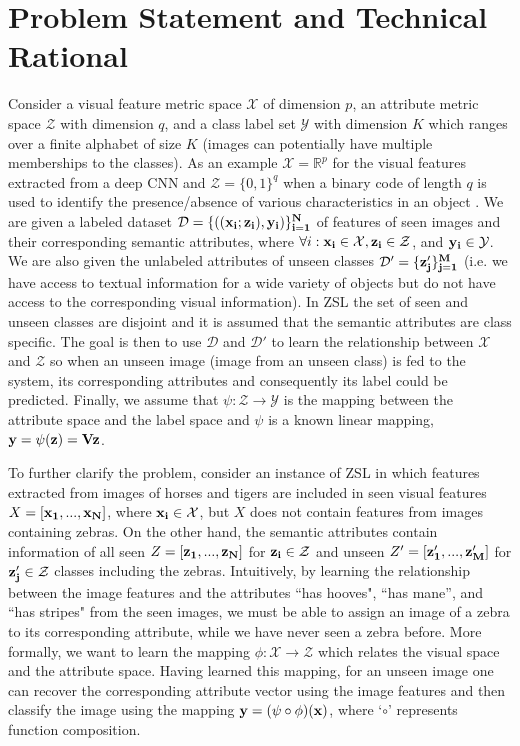 \documentclass[letterpaper]{article} %
\begin{document}
\section{Problem Statement and Technical Rational}

Consider a visual feature metric space $\mathcal{X}$ of dimension  $p$, an  attribute metric space $\mathcal{Z}$ with dimension $q$, and a class label set $\mathcal{Y}$ with dimension $K$ which ranges over a finite alphabet of size $K$ (images can potentially have multiple memberships to the classes). As an example $\mathcal{X}=\mathbb{R}^p$ for the visual features extracted from a deep CNN and $\mathcal{Z}=\{0,1\}^q$ when a binary code of length $q$ is used to identify the presence/absence of various characteristics in an object \cite{lampert2014attribute}. We are given a labeled dataset $\mathcal{D}=\{((\bf{x}_i;\bf{z}_i),\bf{y}_i)\}_{i=1}^N$ of features of seen images and their corresponding semantic attributes, where $\forall i:\bf{x}_i\in \mathcal{X}, \bf{z}_i\in \mathcal{Z}$, and $\bf{y}_{i}\in \mathcal{Y}$.  We are also given the unlabeled attributes of unseen classes  $\mathcal{D}'=\{\bf{z}'_j\}_{j=1}^M$ (i.e. we have access to textual information for a wide variety of objects but do not have access to the corresponding visual information).  In ZSL the set of seen and unseen classes are disjoint and it is  assumed that the semantic attributes are class specific. The goal is then to use $\mathcal{D}$ and $\mathcal{D}'$ to learn the relationship between $\mathcal{X}$ and $\mathcal{Z}$ so when an unseen image (image from an unseen class) is fed to the system, its corresponding attributes and consequently its label could be predicted. Finally, we assume that $\psi:\mathcal{Z}\rightarrow \mathcal{Y}$ is the mapping between the attribute space and the label space and $\psi$ is a known linear mapping, $\bf{y}=\psi(\bf{z})=V\bf{z}$. 

To further clarify the problem, consider an instance of ZSL in which features extracted from images of horses and tigers are included in seen visual features $X=[\bf{x}_1,...,\bf{x}_N]$, where $\bf{x}_i\in\mathcal{X}$, but $X$ does not contain features from images containing zebras. On the other hand, the semantic attributes contain information of all seen $Z=[\bf{z}_1,...,\bf{z}_N]$ for $\bf{z}_i\in\mathcal{Z}$ and unseen $Z'=[\bf{z}'_1,...,\bf{z}'_M]$ for $\bf{z}'_j\in\mathcal{Z}$ classes including the zebras. Intuitively, by learning the relationship  between the image features and the attributes ``has hooves", ``has mane'', and ``has stripes" from the seen images, we must be able to assign an image of a zebra to its corresponding attribute, while we have never seen a zebra before.   More formally, we want to learn the  mapping  $\phi:\mathcal{X}\rightarrow\mathcal{Z} $ which relates the visual space and the attribute space. Having learned this mapping, for an unseen image one can recover the corresponding attribute vector using the image features and then classify the image using the mapping $\bf{y}=(\psi\circ\phi)(\bf{x})$, where `$\circ$' represents function composition. 
\end{document}
